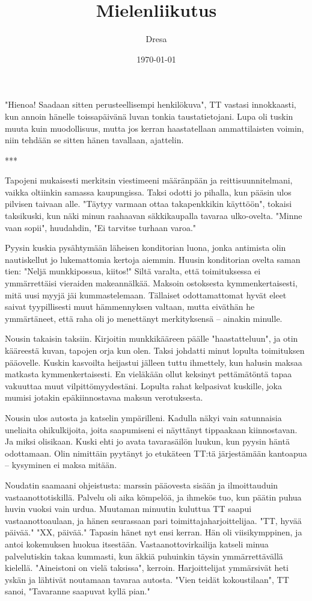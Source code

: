 ﻿\documentclass[a4paper, 12pt, finnish]{article}
\title{Mielenliikutus}
\author{Dresa}
\date{\today}
\begin{document}
\maketitle 

"Hienoa! Saadaan sitten perusteellisempi henkilökuva", TT vastasi
innokkaasti, kun annoin hänelle toissapäivänä luvan tonkia
taustatietojani. Lupa oli tuskin muuta kuin muodollisuus,
mutta jos kerran haastatellaan ammattilaisten voimin,
niin tehdään se sitten hänen tavallaan, ajattelin. 

***

Tapojeni mukaisesti merkitsin viestimeeni määränpään ja
reittisuunnitelmani, vaikka oltiinkin samassa kaupungissa.
Taksi odotti jo pihalla, kun pääsin ulos pilvisen taivaan alle.
"Täytyy varmaan ottaa takapenkkikin käyttöön", tokaisi taksikuski,
kun näki minun raahaavan säkkikaupalla tavaraa ulko-ovelta.
"Minne vaan sopii", huudahdin, "Ei tarvitse turhaan varoa."

Pyysin kuskia pysähtymään läheisen konditorian luona,
jonka antimista olin nautiskellut jo lukemattomia kertoja aiemmin.
Huusin konditorian ovelta saman tien: "Neljä munkkipossua, kiitos!"
Siltä varalta, että toimituksessa ei ymmärrettäisi vieraiden makeannälkää.
Maksoin ostoksesta kymmenkertaisesti, mitä uusi myyjä jäi kummastelemaan.
Tällaiset odottamattomat hyvät eleet saivat tyypillisesti
muut hämmennyksen valtaan, mutta eiväthän he ymmärtäneet,
että raha oli jo menettänyt merkityksensä -- ainakin minulle.

Nousin takaisin taksiin. Kirjoitin munkkikääreen päälle "haastatteluun",
ja otin kääreestä kuvan, tapojen orja kun olen.
Taksi johdatti minut lopulta toimituksen pääovelle. Kuskin kasvoilta
heijastui jälleen tuttu ihmettely, kun halusin maksaa matkasta
kymmenkertaisesti. En vieläkään ollut keksinyt pettämätöntä tapaa
vakuuttaa muut vilpittömyydestäni. Lopulta rahat kelpasivat kuskille,
joka mumisi jotakin epäkiinnostavaa maksun verotuksesta.
 
Nousin ulos autosta ja katselin ympärilleni. Kadulla näkyi vain
satunnaisia uneliaita ohikulkijoita, joita saapumiseni ei näyttänyt
tippaakaan kiinnostavan. Ja miksi olisikaan. Kuski ehti jo avata
tavarasäilön luukun, kun pyysin häntä odottamaan. Olin nimittäin
pyytänyt jo etukäteen TT:tä järjestämään kantoapua -- kysyminen ei
maksa mitään.

Noudatin saamaani ohjeistusta: marssin pääovesta sisään ja
ilmoittauduin vastaanottotiskillä. Palvelu oli aika kömpelöä,
ja ihmekös tuo, kun päätin puhua huvin vuoksi
vain urdua. Muutaman minuutin kuluttua TT saapui vastaanottoaulaan,
ja hänen seurassaan pari toimittajaharjoittelijaa.
"TT, hyvää päivää."
"XX, päivää." Tapasin hänet nyt ensi kerran. Hän oli viisikymppinen,
ja antoi kokemuksen huokua itsestään.
Vastaanottovirkailija katseli minua palvelutiskin takaa kummasti,
kun äkkiä puhuinkin täysin ymmärrettävällä kielellä.
"Aineistoni on vielä taksissa", kerroin. Harjoittelijat ymmärsivät
heti yskän ja lähtivät noutamaan tavaraa autosta.
"Vien teidät kokoustilaan", TT sanoi, "Tavaranne saapuvat kyllä pian."
\end{document}
